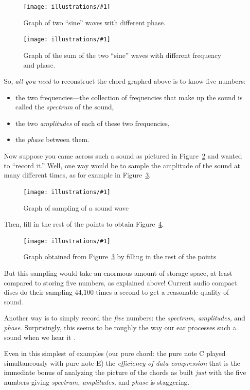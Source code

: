 \documentclass[openany]{book}
\newcommand{\ill}[3]{%
   \begin{figure}[H]%
   \vspace{-2ex}
   \centering%
   \texttt{[image: illustrations/\#1]}%
   \caption{#3}%
   \vspace{-2ex}
    \end{figure}}
\theoremstyle{plain}
\theoremstyle{definition}
\begin{document}
{{\ill{sin-twofreq-phase}{.6}{\label{fig:sin-twofreq-phase}Graph of two ``sine'' waves with different phase.}

\ill{sin-twofreq-phase-sum}{.6}{Graph of the sum of the two ``sine'' waves with different frequency
and phase.\label{fig:sum-sin-phase}}


  So, {\em all you need} to reconstruct the chord graphed above is to
  know five numbers:
  \begin{itemize}
  \item the two frequencies---the collection of frequencies that make
    up the sound is called the {\em spectrum} of the sound,
  \item the two {\em amplitudes} of each of these two frequencies,
  \item the {\em phase} between them.

 \end{itemize}

 Now suppose you came across such a sound as pictured in
 Figure~\ref{fig:sum-sin-phase} and wanted to ``record it.''  Well,
 one way would be to sample the amplitude of the sound at many
 different times, as for example in Figure~\ref{fig:sum-sin-phase-sample}.

\ill{sin-twofreq-phase-sum-points}{.6}{Graph of sampling of a sound wave\label{fig:sum-sin-phase-sample}}

Then, fill in the rest of the points to obtain Figure~\ref{fig:sum-sin-phase-sample-fill}.

\ill{sin-twofreq-phase-sum-fill}{0.6}{Graph obtained from Figure~\ref{fig:sum-sin-phase-sample} by
filling in the rest of the points\label{fig:sum-sin-phase-sample-fill}}

But this sampling would take an enormous amount of storage space, at
least compared to storing five numbers, as explained above!
Current audio compact discs do their sampling 44,100 times a second to
get a reasonable quality of sound.

Another way is to simply record the {\em five} numbers: the {\em
  spectrum, amplitudes,} and {\em phase}.  Surprisingly, this seems to
be roughly the way our ear processes such a sound when we hear it .

  Even in this simplest of examples (our pure chord: the pure note C
  played simultaneously with pure note E) the {\em efficiency of data
    compression} that is the immediate bonus of analyzing the picture
  of the chords as built {\em just} with the five numbers giving {\em
    spectrum, amplitudes,} and {\em phase} is staggering.

}}
\end{document}
